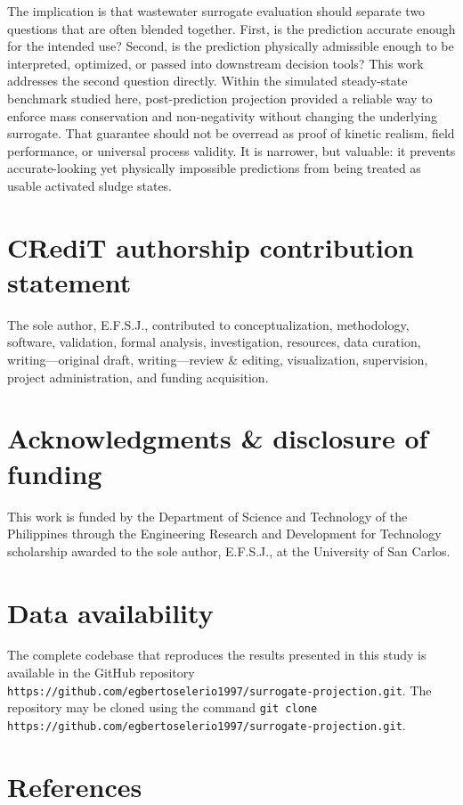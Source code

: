 \documentclass[a4paper,fleqn]{cas-sc}
\begin{document}
The implication is that wastewater surrogate evaluation should separate two questions that are often blended together. First, is the prediction accurate enough for the intended use? Second, is the prediction physically admissible enough to be interpreted, optimized, or passed into downstream decision tools? This work addresses the second question directly. Within the simulated steady-state benchmark studied here, post-prediction projection provided a reliable way to enforce mass conservation and non-negativity without changing the underlying surrogate. That guarantee should not be overread as proof of kinetic realism, field performance, or universal process validity. It is narrower, but valuable: it prevents accurate-looking yet physically impossible predictions from being treated as usable activated sludge states.

\section*{CRediT authorship contribution statement}

The sole author, E.F.S.J., contributed to conceptualization, methodology, software, validation, formal analysis, investigation, resources, data curation, writing---original draft, writing---review \& editing, visualization, supervision, project administration, and funding acquisition.

\section*{Acknowledgments \& disclosure of funding}

This work is funded by the Department of Science and Technology of the Philippines through the Engineering Research and Development for Technology scholarship awarded to the sole author, E.F.S.J., at the University of San Carlos.

\section*{Data availability}

The complete codebase that reproduces the results presented in this study is available in the GitHub repository \texttt{https://github.com/egbertoselerio1997/surrogate-projection.git}. The repository may be cloned using the command \texttt{git clone https://github.com/egbertoselerio1997/surrogate-projection.git}.

\section*{References}
\end{document}
